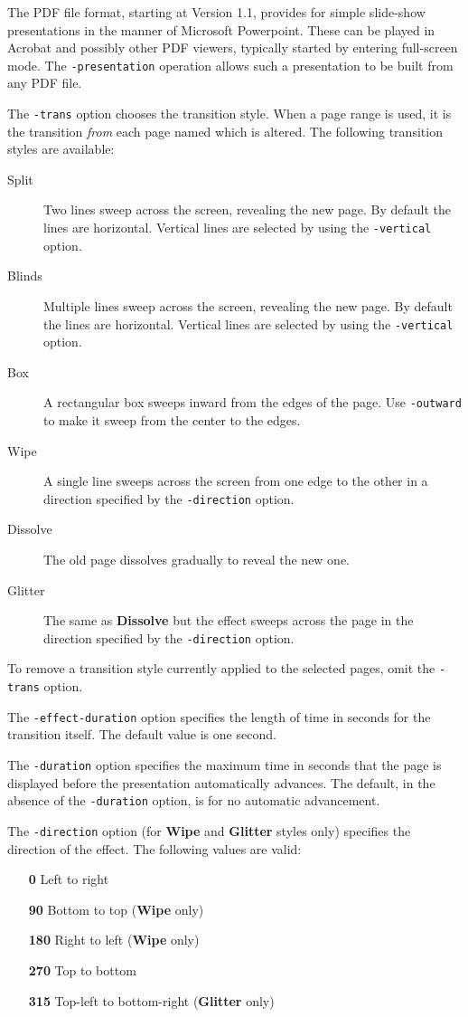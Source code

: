 \documentclass[a4paper,makeidx]{memoir}
\begin{document}
  \vspace{12mm}
The PDF file format, starting at Version 1.1, provides for simple slide-show
presentations in the manner of Microsoft Powerpoint. These can be played in
Acrobat and possibly other PDF viewers, typically started by entering
full-screen mode. The \texttt{-presentation} operation allows such a
presentation to be built from any PDF file.

The \texttt{-trans} option chooses the transition style. When a page range is
used, it is the transition \textit{from} each page named which is altered. The
following transition styles are available:

\begin{description}
  \item[Split]Two lines sweep across the screen, revealing the new page. By
default the lines are horizontal. Vertical lines are selected by using the
\texttt{-vertical} option.
  \item[Blinds]Multiple lines sweep across the screen, revealing the new page.
By default the lines are horizontal. Vertical lines are selected by using the
\texttt{-vertical} option.
  \item[Box]A rectangular box sweeps inward from the edges of the page. Use
\texttt{-outward} to make it sweep from the center to the edges.
  \item[Wipe]A single line sweeps across the screen from one edge to the other
in a direction specified by the \texttt{-direction} option.
  \item[Dissolve]The old page dissolves gradually to reveal the new one.
  \item[Glitter]The same as \textbf{Dissolve} but the effect sweeps across the
page in the direction specified by the \texttt{-direction} option.
\end{description}

\noindent To remove a transition style currently applied to the selected pages,
omit the \texttt{-trans} option.

The \texttt{-effect-duration} option specifies the length of time in seconds
for the transition itself. The default value is one second.

The \texttt{-duration} option specifies the maximum time in seconds that the
page is displayed before the presentation automatically advances. The default,
in the absence of the \texttt{-duration} option, is for no automatic
advancement.

The \texttt{-direction} option (for \textbf{Wipe} and \textbf{Glitter} styles
only) specifies the direction of the effect. The following values are valid:
\begin{itemize}
  \item[\textbf{0}] Left to right
  \item[\textbf{90}] Bottom to top (\textbf{Wipe} only)
  \item[\textbf{180}] Right to left (\textbf{Wipe} only)
  \item[\textbf{270}] Top to bottom
  \item[\textbf{315}] Top-left to bottom-right (\textbf{Glitter} only)
\end{itemize}
\end{document}
